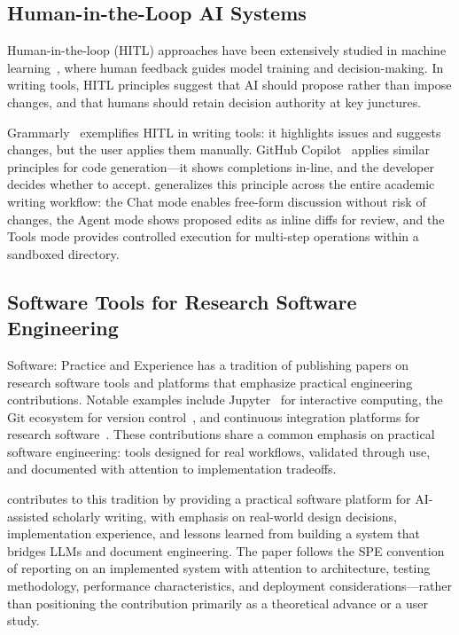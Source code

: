 \subsection{Human-in-the-Loop AI Systems}

Human-in-the-loop (HITL) approaches have been extensively studied in machine
learning~\cite{hitl_survey}, where human feedback guides model training and
decision-making. In writing tools, HITL principles suggest that AI should
propose rather than impose changes, and that humans should retain decision
authority at key junctures.

Grammarly~\cite{grammarly} exemplifies HITL in writing tools: it highlights
issues and suggests changes, but the user applies them manually. GitHub
Copilot~\cite{copilot} applies similar principles for code generation---it shows
completions in-line, and the developer decides whether to accept. \software{}
generalizes this principle across the entire academic writing workflow: the
Chat mode enables free-form discussion without risk of changes, the Agent mode
shows proposed edits as inline diffs for review, and the Tools mode provides
controlled execution for multi-step operations within a sandboxed directory.

\subsection{Software Tools for Research Software Engineering}

Software: Practice and Experience has a tradition of publishing papers on
research software tools and platforms that emphasize practical engineering
contributions. Notable examples include
Jupyter~\cite{jupyter2015software} for interactive computing, the Git
ecosystem for version control~\cite{git}, and continuous integration
platforms for research software~\cite{githubactions}. These contributions share a
common emphasis on practical software engineering: tools designed for real
workflows, validated through use, and documented with attention to
implementation tradeoffs.

\software{} contributes to this tradition by providing a practical software
platform for AI-assisted scholarly writing, with emphasis on real-world design
decisions, implementation experience, and lessons learned from building a system
that bridges LLMs and document engineering. The paper follows the SPE
convention of reporting on an implemented system with attention to architecture,
testing methodology, performance characteristics, and deployment
considerations---rather than positioning the contribution primarily as a
theoretical advance or a user study.
